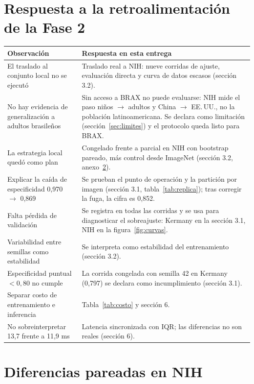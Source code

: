 \documentclass[11pt]{article}
\begin{document}
\section{Respuesta a la retroalimentación de la Fase 2}\label{anx:matriz}
\begin{table}[h]\centering\small
\begin{tabular}{>{\raggedright}p{6.2cm}>{\raggedright\arraybackslash}p{10.3cm}}\toprule
Observación & Respuesta en esta entrega \\\midrule
El traslado al conjunto local no se ejecutó & Traslado real a NIH: nueve corridas de ajuste, evaluación directa y curva de datos escasos (sección 3.2). \\
No hay evidencia de generalización a adultos brasileños & Sin acceso a BRAX no puede evaluarse: NIH mide el paso niños $\rightarrow$ adultos y China $\rightarrow$ EE.\,UU., no la población latinoamericana. Se declara como limitación (sección~\ref{sec:limites}) y el protocolo queda listo para BRAX. \\
La estrategia local quedó como plan & Congelado frente a parcial en NIH con bootstrap pareado, más control desde ImageNet (sección 3.2, anexo~\ref{anx:pareado}). \\
Explicar la caída de especificidad 0,970 $\rightarrow$ 0,869 & Se prueban el punto de operación y la partición por imagen (sección 3.1, tabla~\ref{tab:replica}); tras corregir la fuga, la cifra es 0,852. \\
Falta pérdida de validación & Se registra en todas las corridas y se usa para diagnosticar el sobreajuste: Kermany en la sección 3.1, NIH en la figura~\ref{fig:curvas}. \\
Variabilidad entre semillas como estabilidad & Se interpreta como estabilidad del entrenamiento (sección 3.2). \\
Especificidad puntual $<0{,}80$ no cumple & La corrida congelada con semilla 42 en Kermany (0,797) se declara como incumplimiento (sección 3.1). \\
Separar costo de entrenamiento e inferencia & Tabla~\ref{tab:costo} y sección 6. \\
No sobreinterpretar 13,7 frente a 11,9 ms & Latencia sincronizada con IQR; las diferencias no son reales (sección 6). \\\bottomrule
\end{tabular}
\end{table}

\section{Diferencias pareadas en NIH}\label{anx:pareado}
\begin{table}[h]\centering\small
\caption{Diferencias A $-$ B en puntos porcentuales (AUC en centésimas) con IC 95\% bootstrap pareado por paciente en \texttt{external\_test}.}

\end{table}
\end{document}
